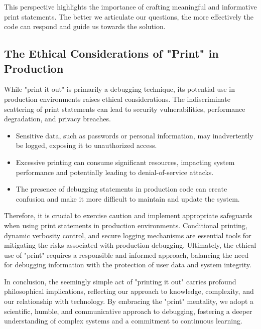 \documentclass{article}
\begin{document}
{{{{This perspective highlights the importance of crafting meaningful and informative print statements. The better we articulate our questions, the more effectively the code can respond and guide us towards the solution.

\subsection*{The Ethical Considerations of "Print" in Production}

While "print it out" is primarily a debugging technique, its potential use in production environments raises ethical considerations. The indiscriminate scattering of print statements can lead to security vulnerabilities, performance degradation, and privacy breaches.

\begin{itemize}
    \item Sensitive data, such as passwords or personal information, may inadvertently be logged, exposing it to unauthorized access.
    \item Excessive printing can consume significant resources, impacting system performance and potentially leading to denial-of-service attacks.
    \item The presence of debugging statements in production code can create confusion and make it more difficult to maintain and update the system.
\end{itemize}

Therefore, it is crucial to exercise caution and implement appropriate safeguards when using print statements in production environments. Conditional printing, dynamic verbosity control, and secure logging mechanisms are essential tools for mitigating the risks associated with production debugging. Ultimately, the ethical use of "print" requires a responsible and informed approach, balancing the need for debugging information with the protection of user data and system integrity.

In conclusion, the seemingly simple act of "printing it out" carries profound philosophical implications, reflecting our approach to knowledge, complexity, and our relationship with technology. By embracing the "print" mentality, we adopt a scientific, humble, and communicative approach to debugging, fostering a deeper understanding of complex systems and a commitment to continuous learning.

\newpage

}}}}
\end{document}
